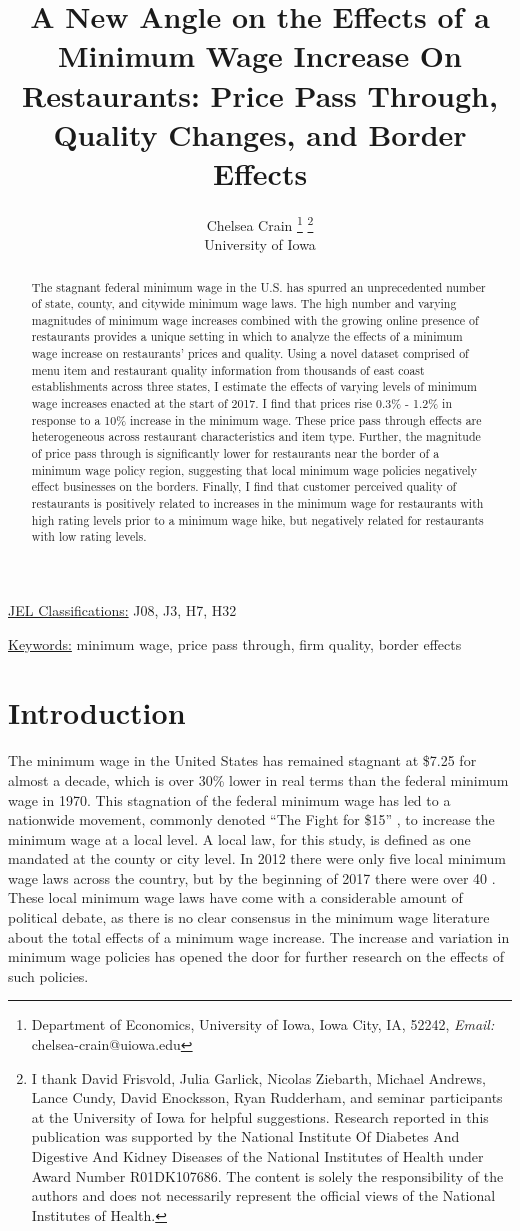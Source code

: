 \documentclass[11pt]{article}
\title{A New Angle on the Effects of a  Minimum Wage Increase On Restaurants:  Price Pass Through, Quality Changes, and Border Effects}
\author{Chelsea Crain \footnote{Department of Economics, University of Iowa, Iowa City, IA, 52242, \textit{Email: }chelsea-crain@uiowa.edu } \thanks{I thank David Frisvold, Julia Garlick, Nicolas Ziebarth, Michael Andrews, Lance Cundy, David Enocksson, Ryan Rudderham, and seminar participants at the University of Iowa for helpful suggestions. Research reported in this publication was supported by the National Institute Of Diabetes And Digestive
And Kidney Diseases of the National Institutes of Health under Award Number R01DK107686.
The content is solely the responsibility of the authors and does not necessarily represent the official views of the National Institutes of Health.} \\ University of Iowa}
\begin{document}
\maketitle

\begin{abstract}
The stagnant federal minimum wage in the U.S. has spurred an unprecedented number of state, county, and citywide minimum wage laws. The high number and varying magnitudes of minimum wage increases combined with the growing online presence of restaurants provides a unique setting in which to analyze the effects of a minimum wage increase on restaurants' prices and quality. Using a novel dataset comprised of menu item and restaurant quality information from thousands of east coast establishments across three states, I estimate the effects of varying levels of minimum wage increases enacted at the start of 2017. I find that prices rise 0.3\% - 1.2\% in response to a 10\% increase in the minimum wage. These price pass through effects are heterogeneous across restaurant characteristics and item type. Further, the magnitude of price pass through is significantly lower for restaurants near the border of a minimum wage policy region, suggesting that local minimum wage policies negatively effect businesses on the borders. Finally, I find that customer perceived quality of restaurants is positively related to increases in the minimum wage for restaurants with high rating levels prior to a minimum wage hike, but negatively related for restaurants with low rating levels. 


\end{abstract}



\underline{JEL Classifications:} J08, J3, H7, H32 

\underline{Keywords:} minimum wage, price pass through, firm quality, border effects

\newpage

\section{Introduction}
The minimum wage in the United States has remained stagnant at \$7.25 for almost a decade, which is over 30\% lower in real terms than the federal minimum wage in 1970. This stagnation of the federal minimum wage has led to a nationwide movement, commonly denoted ``The Fight for \$15'' \cite{ff15}, to increase the minimum wage at a local level. A local law, for this study, is defined as one mandated at the county or city level. In 2012 there were only five local minimum wage laws across the country, but by the beginning of 2017 there were over 40 \cite{localmws}. These local minimum wage laws have come with a considerable amount of political debate, as there is no clear consensus in the minimum wage literature about the total effects of a minimum wage increase. 
The increase and variation in minimum wage policies has opened the door for further research on the effects of such policies. 
\end{document}
